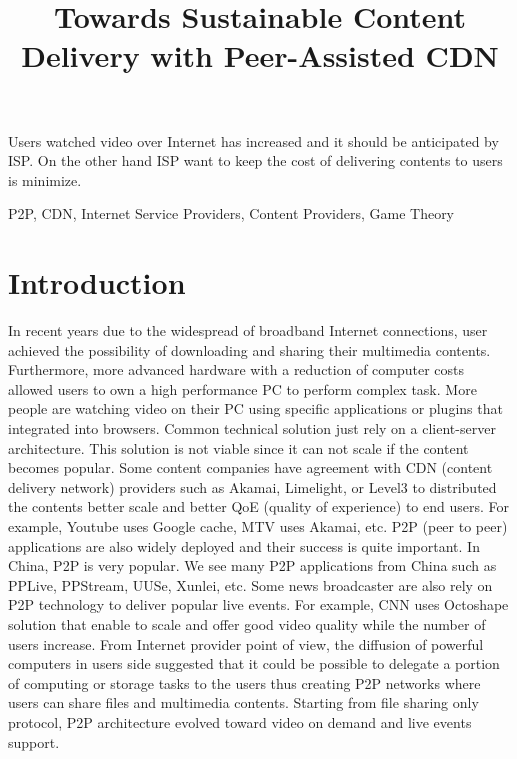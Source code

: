 \documentclass[paper]{ieice}
\title{Towards Sustainable Content Delivery with Peer-Assisted CDN}
\begin{document}
\maketitle

\begin{summary}
Users watched video over Internet has increased and it should be anticipated by ISP.  
On the other hand ISP want to keep the cost of delivering contents to users is minimize.
\end{summary}
\begin{keywords}
P2P, CDN, Internet Service Providers, Content Providers, Game Theory 
\end{keywords}  

\section{Introduction}\label{intro}
In recent years due to the widespread of broadband Internet connections, user achieved the possibility of downloading and sharing their multimedia contents.
Furthermore, more advanced hardware with a reduction of computer costs allowed users to own a high performance PC to perform complex task.
More people are watching video on their PC using specific applications or plugins that integrated into browsers.
Common technical solution just rely on a client-server architecture.
This solution is not viable since it can not scale if the content becomes popular.
Some content companies have agreement with CDN (content delivery network) providers such as Akamai, Limelight, or Level3 to distributed the contents better scale and better QoE (quality of experience) to end users.
For example, Youtube uses Google cache, MTV uses Akamai, etc. P2P (peer to peer) applications are also widely deployed and their success is quite important. 
In China, P2P is very popular. 
We see many P2P applications from China such as PPLive, PPStream, UUSe, Xunlei, etc.  
Some news broadcaster are also rely on P2P technology to deliver popular live events.
For example, CNN uses Octoshape solution that enable to scale and offer good video quality while the number of users increase.
From Internet provider point of view, the diffusion of powerful computers in users side suggested that it could be possible to delegate a portion of computing or storage tasks to the users thus creating P2P networks where users can share files and multimedia contents.
Starting from file sharing only protocol, P2P architecture evolved toward video on demand and live events support. 
\end{document}
